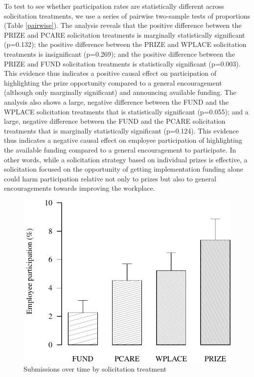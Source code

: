 \documentclass[11pt, titlepage]{article}
\begin{document}
To test to see whether participation rates are statistically different
across solicitation treatments, we use a series of pairwise two-sample
tests of proportions (Table \ref{pairwise}). The analysis reveals that
the positive difference between the PRIZE and PCARE solicitation
treatments is marginally statistically significant (p=0.132); the
positive difference between the PRIZE and WPLACE solicitation treatments
is insignificant (p=0.269); and the positive difference between the
PRIZE and FUND solicitation treatments is statistically significant
(p=0.003). This evidence thus indicates a positive causal effect on
participation of highlighting the prize opportunity compared to a
general encouragement (although only marginally significant) and
announcing available funding. The analysis also shows a large, negative
difference between the FUND and the WPLACE solicitation treatments that
is statistically significant (p=0.055); and a large, negative difference
between the FUND and the PCARE solicitation treatments that is
marginally statistically significant (p=0.124). This evidence thus
indicates a negative causal effect on employee participation of
highlighting the available funding compared to a general encouragement
to participate. In other words, while a solicitation strategy based on
individual prizes is effective, a solicitation focused on the
opportunity of getting implementation funding alone could harm
participation relative not only to prizes but also to general
encouragements towards improving the workplace.

\begin{figure}
\caption{Submissions over time by solicitation treatment}
\label{figure_dynamics}
\centering
\includegraphics{figures/figure_participation-1.pdf}
\end{figure}
\end{document}
